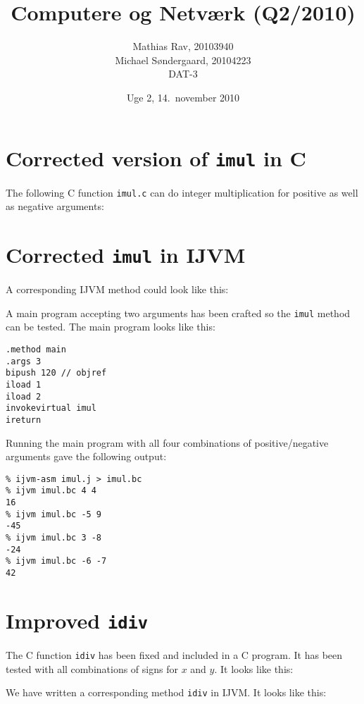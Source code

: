 \documentclass[12pt,a4paper]{article}
\title{Computere og Netværk (Q2/2010)}
\author{Mathias Rav, 20103940 \\
		Michael Søndergaard, 20104223 \\
		DAT-3}
\date{Uge 2, 14.\ november 2010}
\newcommand{\imul}{\texttt{imul}}
\begin{document}
\maketitle

\section{Corrected version of \imul{} in C}

The following C function \texttt{imul.c} can do integer multiplication for
positive as well as negative arguments:

\lstset{language=C}


\section{Corrected \imul{} in IJVM}

A corresponding IJVM method could look like this:

\lstset{language=JVMIS}


A main program accepting two arguments has been crafted so the \texttt{imul}
method can be tested. The main program looks like this:

\begin{lstlisting}
.method main
.args 3
bipush 120 // objref
iload 1
iload 2
invokevirtual imul
ireturn
\end{lstlisting}

Running the main program with all four combinations of positive/negative
arguments gave the following output:

\lstset{language=sh,numbers=none}
\begin{lstlisting}
% ijvm-asm imul.j > imul.bc
% ijvm imul.bc 4 4
16
% ijvm imul.bc -5 9
-45
% ijvm imul.bc 3 -8
-24
% ijvm imul.bc -6 -7
42
\end{lstlisting}
\section{Improved \texttt{idiv}}

The C function \texttt{idiv} has been fixed and included in a C program. It has
been tested with all combinations of signs for $x$ and $y$. It looks like this:

\lstset{language=C,numbers=left}


We have written a corresponding method \texttt{idiv} in IJVM. It looks like
this:
\end{document}

